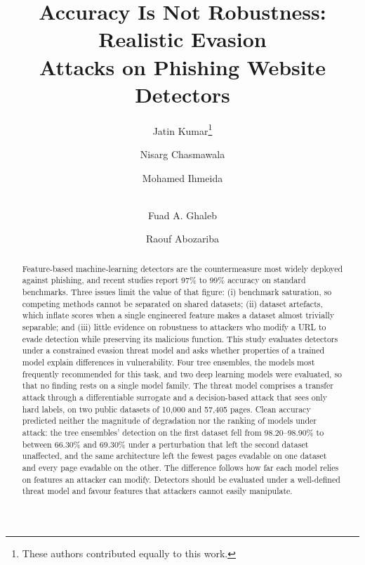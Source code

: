 \documentclass[runningheads]{llncs}
\begin{document}
\title{\texorpdfstring{Accuracy Is Not Robustness: Realistic Evasion\\ Attacks on
Phishing Website Detectors}{Accuracy Is Not Robustness: Realistic Evasion Attacks
on Phishing Website Detectors}}


\author{Jatin Kumar\thanks{These authors contributed equally to this work.} \and Nisarg Chasmawala\protect\footnotemark[1] \and Mohamed Ihmeida \and\\
Fuad A. Ghaleb \and Raouf Abozariba}


\maketitle

\begin{abstract}
Feature-based machine-learning detectors are the countermeasure most widely
deployed against phishing, and recent studies report 97\% to 99\% accuracy
on standard benchmarks. Three issues limit the value of that figure: (i)
benchmark saturation, so competing methods cannot be separated on shared
datasets; (ii) dataset artefacts, which inflate scores when a single engineered
feature makes a dataset almost trivially separable; and (iii) little evidence on
robustness to attackers who modify a URL to evade detection while preserving its
malicious function. This study evaluates detectors under a constrained evasion
threat model and asks whether properties of a trained model explain differences
in vulnerability. Four tree ensembles, the models most frequently recommended
for this task, and two deep learning models were evaluated, so that no finding
rests on a single model family. The threat model comprises a transfer attack
through a differentiable surrogate and a decision-based attack that sees only
hard labels, on two public datasets of 10,000 and 57,405 pages. Clean
accuracy predicted neither the magnitude of degradation nor the ranking of
models under attack: the tree ensembles' detection on the first dataset fell
from 98.20--98.90\% to between 66.30\% and 69.30\% under a perturbation that left
the second dataset unaffected, and the same architecture left the fewest pages evadable on one dataset
and every page evadable on the other. The difference follows how
far each model relies on features an attacker can modify. Detectors should be evaluated under a well-defined threat model and favour features
that attackers cannot easily manipulate.

\end{abstract}
\end{document}
